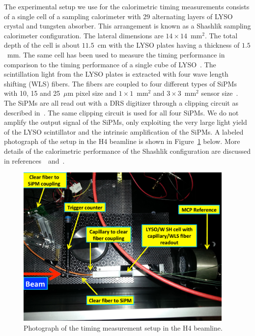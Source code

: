 The experimental setup we use for the calorimetric timing measurements consists
of a single cell of a sampling calorimeter with 29 alternating layers of LYSO
crystal and tungsten absorber. This arrangement is known as a Shashlik sampling
calorimeter configuration. The lateral dimensions are
$14\times14$~$\mathrm{mm}^{2}$. The total depth of the cell is about $11.5$~cm
with the LYSO plates having a thickness of $1.5$~mm. The same cell has been used
to measure the timing performance in comparison to the timing performance of a
single cube of LYSO~\cite{lysotiming}. The scintillation light from the LYSO
plates is extracted with four wave length shifting (WLS) fibers. The fibers are
coupled to four different types of SiPMs with 10, 15 and 25~$\mu$m pixel size
and $1\times 1$~$\mathrm{mm}^{2}$ and $3\times 3$~$\mathrm{mm}^{2}$ sensor
size~\cite{hama}. The SiPMs are all read out with a DRS digitizer through a
clipping circuit as described in~\cite{aashrita}. The same clipping circuit is 
used for all four SiPMs. We do not amplify the output
signal of the SiPMs, only exploiting the very large light yield of the LYSO
scintillator and the intrinsic amplification of the SiPMs. A labeled photograph
of the setup in the H4 beamline is shown in Figure~\ref{fig:TestbeamSetup}
below. More details of the calorimetric performance of the Shashlik
configuration are discussed in references~\cite{shashlik1}~and~\cite{shashlik2}.

\begin{figure}[htbp] 
\centering
\includegraphics[width=0.95\textwidth]{figures/ShashlikTBSetupDiagram} 
\caption{Photograph of the timing measurement setup in the H4 beamline.} 
\label{fig:TestbeamSetup} 
\end{figure} 

